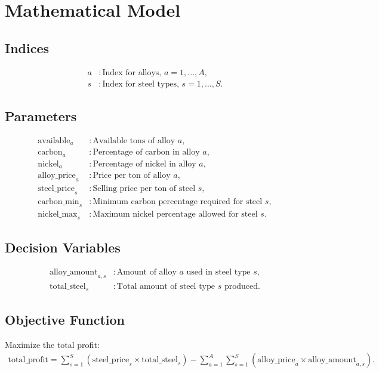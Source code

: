 \documentclass{article}
\begin{document}
\section*{Mathematical Model}

\subsection*{Indices}
\begin{align*}
a & : \text{Index for alloys, } a = 1, \ldots, A,\\
s & : \text{Index for steel types, } s = 1, \ldots, S.
\end{align*}

\subsection*{Parameters}
\begin{align*}
\text{available}_a & : \text{Available tons of alloy } a,\\
\text{carbon}_a & : \text{Percentage of carbon in alloy } a,\\
\text{nickel}_a & : \text{Percentage of nickel in alloy } a,\\
\text{alloy\_price}_a & : \text{Price per ton of alloy } a,\\
\text{steel\_price}_s & : \text{Selling price per ton of steel } s,\\
\text{carbon\_min}_s & : \text{Minimum carbon percentage required for steel } s,\\
\text{nickel\_max}_s & : \text{Maximum nickel percentage allowed for steel } s.
\end{align*}

\subsection*{Decision Variables}
\begin{align*}
\text{alloy\_amount}_{a,s} & : \text{Amount of alloy } a \text{ used in steel type } s,\\
\text{total\_steel}_s & : \text{Total amount of steel type } s \text{ produced}.
\end{align*}

\subsection*{Objective Function}
Maximize the total profit:
\begin{align*}
\text{total\_profit} = \sum_{s=1}^{S} \left( \text{steel\_price}_s \times \text{total\_steel}_s \right) - \sum_{a=1}^{A} \sum_{s=1}^{S} \left( \text{alloy\_price}_a \times \text{alloy\_amount}_{a,s} \right).
\end{align*}
\end{document}
